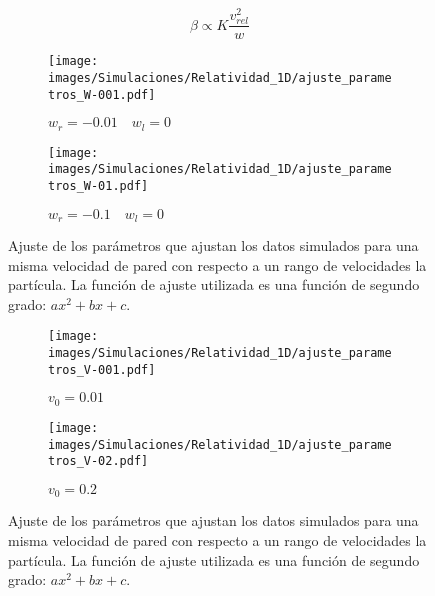 \begin{equation}
    \beta \propto K \dfrac{v^2_{rel}}{w}
\end{equation}


\vspace{3mm}

\begin{figure}[H]
    \begin{subfigure}[b]{0.5\textwidth}
        \centering
        \texttt{[image: images/Simulaciones/Relatividad\_1D/ajuste\_parametros\_W-001.pdf]}
        \caption{$w_r = -0.01 \quad w_l = 0$}
    \end{subfigure}
    \hfill
    \begin{subfigure}[b]{0.5\textwidth}
        \centering
        \texttt{[image: images/Simulaciones/Relatividad\_1D/ajuste\_parametros\_W-01.pdf]}
        \caption{$w_r = -0.1 \quad w_l = 0$}
    \end{subfigure}
    \caption{Ajuste de los parámetros que ajustan los datos simulados para una misma velocidad de pared con respecto a un rango de velocidades la partícula. La función de ajuste utilizada es una función de segundo grado: \( ax^2 + bx + c \).}
    \label{fig:ajuste_parametros_1D_relativity}
\end{figure}

\begin{figure}[h]
    \begin{subfigure}[b]{0.5\textwidth}
        \centering
        \texttt{[image: images/Simulaciones/Relatividad\_1D/ajuste\_parametros\_V-001.pdf]}
        \caption{$v_0 = 0.01$}
    \end{subfigure}
    \hfill
    \begin{subfigure}[b]{0.5\textwidth}
        \centering
        \texttt{[image: images/Simulaciones/Relatividad\_1D/ajuste\_parametros\_V-02.pdf]}
        \caption{$v_0 = 0.2$}
    \end{subfigure}
    \caption{Ajuste de los parámetros que ajustan los datos simulados para una misma velocidad de pared con respecto a un rango de velocidades la partícula. La función de ajuste utilizada es una función de segundo grado: \( ax^2 + bx + c \).}
    \label{fig:ajuste_parametros_1D_relativity_Vcte}
\end{figure}


